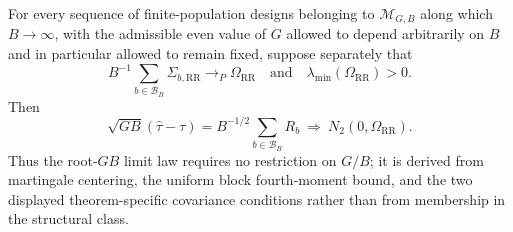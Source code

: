 For every sequence of finite-population designs belonging to \(\mathcal M_{G,B}\) along which \(B\to\infty\), with the admissible even value of \(G\) allowed to depend arbitrarily on \(B\) and in particular allowed to remain fixed, suppose separately that
\[
B^{-1}\sum_{b\in\mathcal B_B}\Sigma_{b,\mathrm{RR}}\to_P\Omega_{\mathrm{RR}}
\quad\text{and}\quad
\lambda_{\min}(\Omega_{\mathrm{RR}})>0.
\]
Then
\[
\sqrt{GB}(\widehat\tau-\tau)=B^{-1/2}\sum_{b\in\mathcal B_B}R_b\ \Rightarrow\ N_2(0,\Omega_{\mathrm{RR}}).
\]
Thus the root-\(GB\) limit law requires no restriction on \(G/B\); it is derived from martingale centering, the uniform block fourth-moment bound, and the two displayed theorem-specific covariance conditions rather than from membership in the structural class.